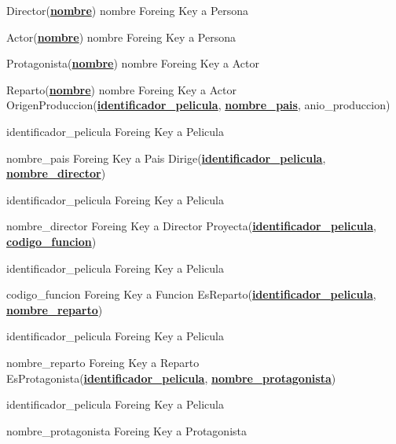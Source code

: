 \documentclass[15pt]{article}
\begin{document}
\hspace{1cm} Director(\underline{\textbf{nombre}})  nombre  Foreing Key a Persona
    
\hspace{1cm} Actor(\underline{\textbf{nombre}})   nombre  Foreing Key a Persona
    
\hspace{2cm} Protagonista(\underline{\textbf{nombre}})    nombre  Foreing Key a Actor
        
\hspace{2cm} Reparto(\underline{\textbf{nombre}}) nombre  Foreing Key a Actor
\newline
\newline
OrigenProduccion(\underline{\textbf{identificador\_pelicula}}, \underline{\textbf{nombre\_pais}}, anio\_produccion)

\hspace{1cm} identificador\_pelicula	Foreing Key a Pelicula

\hspace{1cm} nombre\_pais	Foreing Key a Pais
\newline
Dirige(\underline{\textbf{identificador\_pelicula}}, \underline{\textbf{nombre\_director}})

\hspace{1cm} identificador\_pelicula	Foreing Key a Pelicula
    
\hspace{1cm} nombre\_director	Foreing Key a Director
\newline
Proyecta(\underline{\textbf{identificador\_pelicula}}, \underline{\textbf{codigo\_funcion}})

\hspace{1cm} identificador\_pelicula	Foreing Key a Pelicula
    
\hspace{1cm} codigo\_funcion	Foreing Key a Funcion
\newline
EsReparto(\underline{\textbf{identificador\_pelicula}}, \underline{\textbf{nombre\_reparto}})

\hspace{1cm} identificador\_pelicula	Foreing Key a Pelicula
    
\hspace{1cm} nombre\_reparto	Foreing Key a Reparto
\newline
EsProtagonista(\underline{\textbf{identificador\_pelicula}}, \underline{\textbf{nombre\_protagonista}})

\hspace{1cm} identificador\_pelicula	Foreing Key a Pelicula
    
\hspace{1cm} nombre\_protagonista	Foreing Key a Protagonista
\newline
\newline
\end{document}
